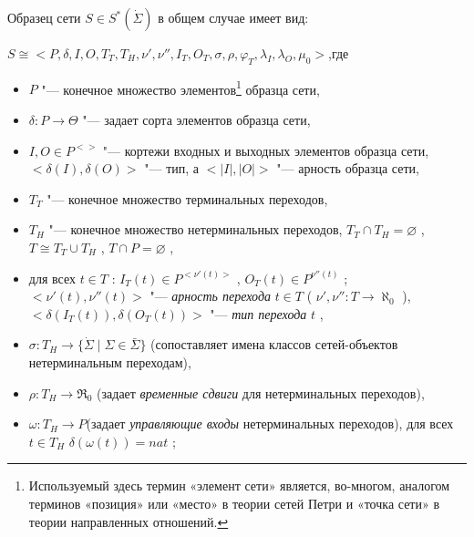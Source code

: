 		Образец сети  $S\in{S^*(\dot{\Sigma})}$   в общем случае имеет вид:
		\begin{center}
			$S\cong<P,\delta,I,O,T_T,T_H,\nu',\nu'',I_T,O_T,\sigma,\rho,\varphi_T,\lambda_I,\lambda_O,\mu_0> $,где
		\end{center}
		\begin{itemize}
		  \item $P$ 
		  "--- конечное множество элементов\footnote{Используемый здесь термин «элемент сети» является, во-многом, аналогом терминов «позиция» или «место» в теории сетей Петри и «точка сети» в теории направленных отношений.}
		    образца сети,
		 
		  \item $\delta:P \rightarrow \Theta$  "--- задает сорта элементов образца сети,
		  \item  $I,O \in P^{<>}$ "--- кортежи входных и выходных элементов образца сети, \mbox{$<\delta(I),\delta(O)>$}  "---  тип, а $<|I|,|O|>$   "--- арность образца сети,
		  
		  \item $T_T$ 
		  "--- конечное множество терминальных переходов,
		  
		  \item $T_H$ 
		  "--- конечное множество нетерминальных переходов,
		    $T_T \cap T_H = \varnothing$  , $T\cong  T_T \cup T_H$ , $T \cap P = \varnothing$ ,
		 
		  \item	для всех $ t \in T$  : $I_T(t) \in P^{<\nu'(t)>}$ ,
		   $ O_T(t) \in P^{\nu''(t)} $  ;\\
		    $<\nu'(t), \nu''(t)>$   "--- \textit{арность перехода}  $ t \in T $   ( $ \nu',\nu'':T\rightarrow\aleph_0 $ ),\\
		  $ <\delta(I_T(t)),\delta(O_T(t))> $  "--- \textit{тип перехода} $t$  , 
		  
		  \item $ \sigma:T_H \rightarrow \{ \dot{\Sigma}\;| \;\Sigma \in \bar{\Sigma} \} $ (сопоставляет имена классов сетей-объектов нетерминальным переходам),
		  
		  \item $ \rho:T_H \rightarrow \Re_0 $ (задает \textit{временные сдвиги} для нетерминальных переходов),
		  
		  \item $ \omega:T_H \rightarrow P $(задает \textit{управляющие входы} нетерминальных переходов), для всех  $ t \in T_H $  $ \delta(\omega(t)) = \textit{nat} $   ;
		  

\end{itemize}
